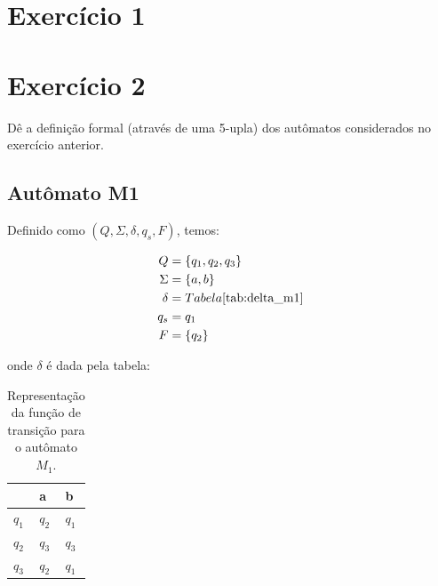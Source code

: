 \documentclass[a4paper, 12pt]{article}
\begin{document}
\newpage
\tableofcontents
\thispagestyle{empty}

\newpage
{}

\newpage
\section{Exercício 1}


\newpage
\section{Exercício 2}

Dê a definição formal (através de uma 5-upla) dos autômatos considerados no exercício anterior.

\subsection{Autômato M1}
Definido como $(Q, \Sigma, \delta, q_s, F)$, temos:

\begin{align*}
    Q &= \{q_1, q_2, q_3\} \\
    \Sigma &= \{a, b\} \\
    \delta &= Tabela \text{\ref{tab:delta_m1}} \\
    q_s &= q_1 \\
    F &= \{q_2\}
\end{align*}

onde $\delta$ é dada pela tabela:

\begin{table}[!h]
    \centering
    \begin{tabular}{l|ll}
              & a     & b     \\ 
        \hline \hline
        $q_1$ & $q_2$ & $q_1$ \\
        $q_2$ & $q_3$ & $q_3$ \\
        $q_3$ & $q_2$ & $q_1$ \\
    \end{tabular}
    \caption{Representação da função de transição para o autômato $M_1$.}
    \label{tab:delta_m1}
\end{table}
\end{document}

